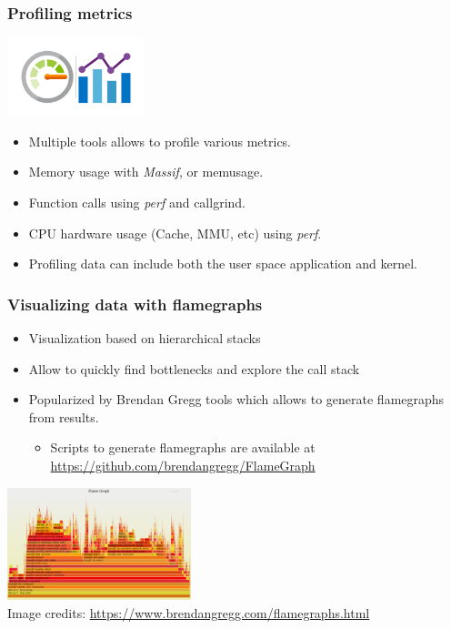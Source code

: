 \begin{frame}
  \frametitle{Profiling metrics}
  \center \includegraphics[width=0.3\textwidth]{../slides/debugging-application-profiling/metrics.png}
  \begin{itemize}
    \item Multiple tools allows to profile various metrics.
    \item Memory usage with {\em Massif},  or memusage.
    \item Function calls using {\em perf} and callgrind.
    \item CPU hardware usage (Cache, MMU, etc) using {\em perf}.
    \item Profiling data can include both the user space application and kernel.
  \end{itemize}
\end{frame}

\begin{frame}
  \frametitle{Visualizing data with flamegraphs}
  \begin{itemize}
    \item Visualization based on hierarchical stacks
    \item Allow to quickly find bottlenecks and explore the call stack
    \item Popularized by Brendan Gregg tools which allows to generate
          flamegraphs from  results.
    \begin{itemize}
      \item Scripts to generate flamegraphs are available at
            \url{https://github.com/brendangregg/FlameGraph}
    \end{itemize} 
  \end{itemize}
  \center \includegraphics[width=0.4\textwidth]{../slides/debugging-application-profiling/flamegraph.png}\\
  \tiny Image credits: \url{https://www.brendangregg.com/flamegraphs.html}
\end{frame}

